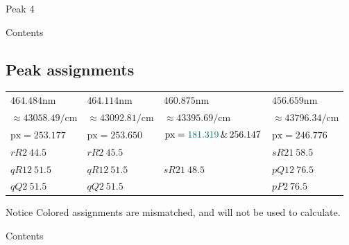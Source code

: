 \documentclass[aspectratio=43,scheme=plain]{ctexbeamer}
\begin{document}
\begin{frame}{Peak 4}
\begin{figure}[H]
\end{figure}
\end{frame}
\begin{frame}{Contents}
\end{frame}
\subsection{Peak assignments}
\begin{frame}{\insertsubsection}\nocite{pgopher}
			\begin{table}
			\centering  	 
			\scriptsize
			\begin{tabularx}{0.97\textwidth}{llll}    
				\toprule   
				$464.484 \unit{\nano \meter}$ &$464.114\unit{\nano \meter}$&$460.875 \unit{\nano \meter}$& $456.659 \unit{\nano \meter}$\\
				$\approx43058.49 \unit{\per \centi \meter}$ &   $\approx43092.81\unit{\per \centi \meter}$ &  $\approx 43395.69\unit{\per \centi \meter}$ & $\approx 43796.34\unit{\per \centi \meter} $\\
				\midrule   
				$\text{px}=253.177$ & $\text{px}=253.650$ & $\text{px}=\textcolor[RGB]{0,112,127}{181.319}\,\&\,256.147$ &$ \text{px}=246.776$ \\  
				\midrule 
				$rR2\:44.5$ & $rR2\:45.5$ &  &$sR21\:58.5$\\  
				\textcolor[RGB]{0,112,127}{$qR12\:51.5$} & \textcolor[RGB]{0,112,127}{$qR12 \:51.5$} &  $sR21\:48.5$ & \textcolor[RGB]{0,112,127}{$pQ12 \:76.5$} \\ 
				\textcolor[RGB]{0,112,127}{$qQ2\: 51.5$} & \textcolor[RGB]{0,112,127}{$qQ2\: 51.5$} &   & \textcolor[RGB]{0,112,127}{$pP2\: 76.5$} \\ 
				\bottomrule    
			\end{tabularx}%
			\label{tab:addlabel}%
		\end{table}%
		\begin{alertblock}{Notice}
			\textcolor[RGB]{0,112,127}{Colored} assignments are mismatched, and will not be used to calculate.
		\end{alertblock}
	\end{frame}
	\begin{frame}{Contents}
	\end{frame}
\end{document}
